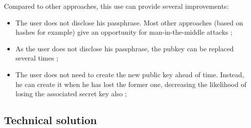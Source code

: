 \documentclass[10pt,a4paper]{article}
\begin{document}
Compared to other approaches, this use can provide several
improvements:
\begin{itemize}
\item The user does not disclose his passphrase. Most other approaches
  (based on hashes for example) give an opportunity for
  man-in-the-middle attacks ;
\item As the user does not disclose his passphrase, the pubkey can be
  replaced several times ;
\item The user does not need to create the new public key ahead of
  time. Instead, he can create it when he has lost the former one,
  decreasing the likelihood of losing the associated secret key also ;
\end{itemize}

\subsection{Technical solution}
\end{document}
